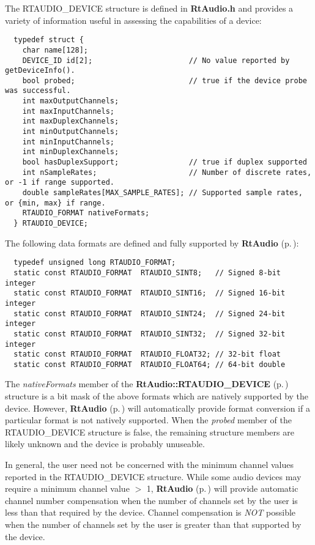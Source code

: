 The RTAUDIO\_\-DEVICE structure is defined in {\bf Rt\-Audio.h} and provides a variety of information useful in assessing the capabilities of a device:

\footnotesize\begin{verbatim}  typedef struct {
    char name[128];
    DEVICE_ID id[2];                      // No value reported by getDeviceInfo().
    bool probed;                          // true if the device probe was successful.
    int maxOutputChannels;
    int maxInputChannels;
    int maxDuplexChannels;
    int minOutputChannels;
    int minInputChannels;
    int minDuplexChannels;
    bool hasDuplexSupport;                // true if duplex supported
    int nSampleRates;                     // Number of discrete rates, or -1 if range supported.
    double sampleRates[MAX_SAMPLE_RATES]; // Supported sample rates, or {min, max} if range.
    RTAUDIO_FORMAT nativeFormats;
  } RTAUDIO_DEVICE;\end{verbatim}\normalsize 


The following data formats are defined and fully supported by {\bf Rt\-Audio} {\rm (p.\,\pageref{classRtAudio})}:

\footnotesize\begin{verbatim}  typedef unsigned long RTAUDIO_FORMAT;
  static const RTAUDIO_FORMAT  RTAUDIO_SINT8;   // Signed 8-bit integer
  static const RTAUDIO_FORMAT  RTAUDIO_SINT16;  // Signed 16-bit integer
  static const RTAUDIO_FORMAT  RTAUDIO_SINT24;  // Signed 24-bit integer
  static const RTAUDIO_FORMAT  RTAUDIO_SINT32;  // Signed 32-bit integer
  static const RTAUDIO_FORMAT  RTAUDIO_FLOAT32; // 32-bit float
  static const RTAUDIO_FORMAT  RTAUDIO_FLOAT64; // 64-bit double\end{verbatim}\normalsize 


The {\em native\-Formats} member of the {\bf Rt\-Audio::RTAUDIO\_\-DEVICE} {\rm (p.\,\pageref{structRtAudio_1_1RTAUDIO__DEVICE})} structure is a bit mask of the above formats which are natively supported by the device. However, {\bf Rt\-Audio} {\rm (p.\,\pageref{classRtAudio})} will automatically provide format conversion if a particular format is not natively supported. When the {\em probed} member of the RTAUDIO\_\-DEVICE structure is false, the remaining structure members are likely unknown and the device is probably unuseable.

In general, the user need not be concerned with the minimum channel values reported in the RTAUDIO\_\-DEVICE structure. While some audio devices may require a minimum channel value $>$ 1, {\bf Rt\-Audio} {\rm (p.\,\pageref{classRtAudio})} will provide automatic channel number compensation when the number of channels set by the user is less than that required by the device. Channel compensation is {\em NOT} possible when the number of channels set by the user is greater than that supported by the device.

